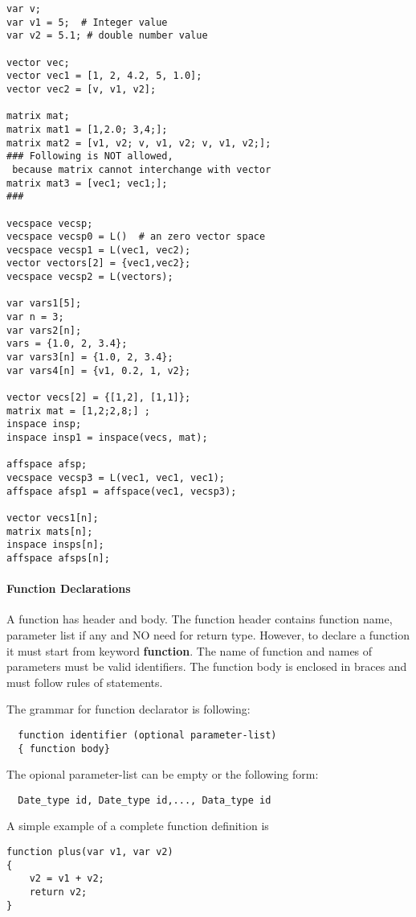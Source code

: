 \documentclass[12pt]{article} %
\begin{document}
\begin{lstlisting}[mathescape=true]
var v;
var v1 = 5;  # Integer value
var v2 = 5.1; # double number value

vector vec;
vector vec1 = [1, 2, 4.2, 5, 1.0];
vector vec2 = [v, v1, v2];

matrix mat;
matrix mat1 = [1,2.0; 3,4;];
matrix mat2 = [v1, v2; v, v1, v2; v, v1, v2;];
### Following is NOT allowed,
 because matrix cannot interchange with vector
matrix mat3 = [vec1; vec1;];
###

vecspace vecsp;
vecspace vecsp0 = L()  # an zero vector space
vecspace vecsp1 = L(vec1, vec2);
vector vectors[2] = {vec1,vec2};
vecspace vecsp2 = L(vectors);

var vars1[5];
var n = 3;
var vars2[n];
vars = {1.0, 2, 3.4};
var vars3[n] = {1.0, 2, 3.4};
var vars4[n] = {v1, 0.2, 1, v2};

vector vecs[2] = {[1,2], [1,1]};
matrix mat = [1,2;2,8;] ;
inspace insp;
inspace insp1 = inspace(vecs, mat);

affspace afsp;
vecspace vecsp3 = L(vec1, vec1, vec1);
affspace afsp1 = affspace(vec1, vecsp3);

vector vecs1[n];
matrix mats[n];
inspace insps[n];
affspace afsps[n];

\end{lstlisting}

\paragraph{Function Declarations}
A function has header and body. The function header contains function name, parameter list if any and NO need for return type. However, to declare a function it must start from keyword \textbf{function}. The name of function and names of parameters must be valid identifiers. The function body is enclosed in braces and must follow rules of statements.

The grammar for function declarator is following:
\begin{lstlisting}
  function identifier (optional parameter-list) 
  { function body} 
\end{lstlisting}
The opional parameter-list can be empty or the following form:
\begin{lstlisting}
  Date_type id, Date_type id,..., Data_type id
\end{lstlisting}
A simple example of a complete function definition is
\begin{lstlisting}[mathescape=true]
function plus(var v1, var v2)
{
	v2 = v1 + v2;
	return v2;
}
\end{lstlisting}
\end{document}
